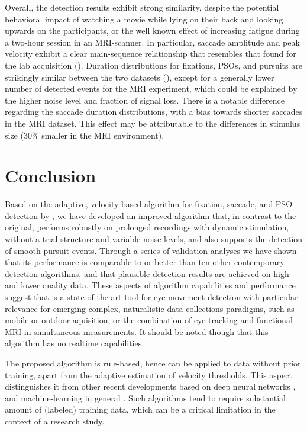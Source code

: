 Overall, the detection results exhibit strong similarity, despite the potential
behavioral impact of watching a movie while lying on their back and looking
upwards on the participants, or the well known effect of increasing fatigue
during a two-hour session in an MRI-scanner. In particular, saccade amplitude
and peak velocity exhibit a clear main-sequence relationship that resembles
that found for the lab acquisition (). Duration distributions
for fixations, PSOs, and pursuits are strikingly similar between the two
datasets (), except for a generally lower number of detected events
for the MRI experiment, which could be explained by the higher noise level and
fraction of signal loss. There is a notable difference regarding the saccade
duration distributions, with a bias towards shorter saccades in the MRI
dataset. This effect may be attributable to the differences in stimulus size
(30\% smaller in the MRI environment).


\section*{Conclusion}\label{con}

Based on the adaptive, velocity-based algorithm for fixation, saccade, and PSO
detection by \cite{Nystrom2010AnData}, we have developed an improved algorithm
that, in contrast to the original, performs robustly on prolonged recordings
with dynamic stimulation, without a trial structure and variable noise levels,
and also supports the detection of smooth pursuit events. Through a series of
validation analyses we have shown that its performance is comparable to or
better than ten other contemporary detection algorithms, and that plausible
detection results are achieved on high and lower quality data.
These aspects of algorithm capabilities and performance suggest that \remodnav
is a state-of-the-art tool for eye movement detection with particular relevance
for emerging complex, naturalistic data collections paradigms, such as
mobile or outdoor aquisition, or the combination of eye tracking and functional
MRI in simultaneous measurements. It should be noted though that this algorithm
has no realtime capabilities.

The proposed algorithm is rule-based, hence can be applied to data without
prior training, apart from the adaptive estimation of velocity thresholds.
This aspect distinguishes it from other recent developments based on deep
neural networks \citep{Startsev2018}, and machine-learning in general
\citep{Zemblys2018}. Such algorithms tend to require substantial amount of
(labeled) training data, which can be a critical limitation in the context of a
research study.

